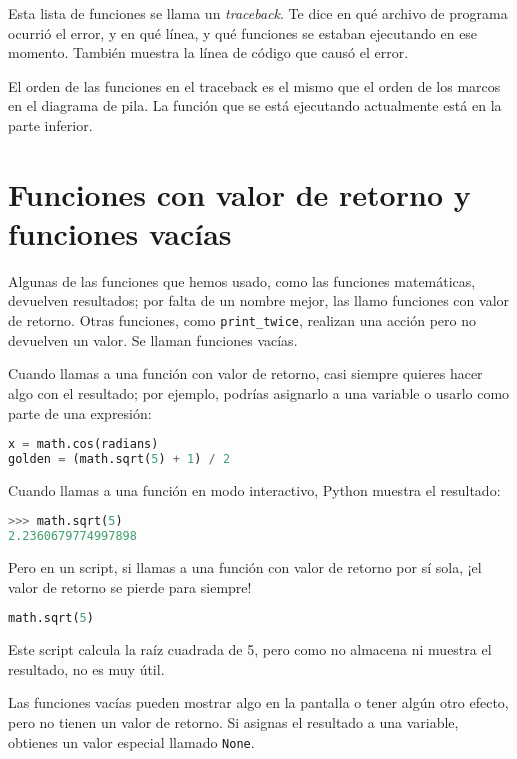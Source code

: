 \documentclass[12pt,letterpaper]{book}
\begin{document}
Esta lista de funciones se llama un \textit{traceback}. Te dice en qué archivo de programa ocurrió el error, y en qué línea, y qué funciones se estaban ejecutando en ese momento. También muestra la línea de código que causó el error.

El orden de las funciones en el traceback es el mismo que el orden de los marcos en el diagrama de pila. La función que se está ejecutando actualmente está en la parte inferior.

\section{Funciones con valor de retorno y funciones vacías}

Algunas de las funciones que hemos usado, como las funciones matemáticas, devuelven resultados; por falta de un nombre mejor, las llamo funciones con valor de retorno. Otras funciones, como \texttt{print\_twice}, realizan una acción pero no devuelven un valor. Se llaman funciones vacías.

Cuando llamas a una función con valor de retorno, casi siempre quieres hacer algo con el resultado; por ejemplo, podrías asignarlo a una variable o usarlo como parte de una expresión:

\begin{lstlisting}[language=Python]
x = math.cos(radians)
golden = (math.sqrt(5) + 1) / 2
\end{lstlisting}

Cuando llamas a una función en modo interactivo, Python muestra el resultado:

\begin{lstlisting}[language=Python]
>>> math.sqrt(5)
2.2360679774997898
\end{lstlisting}

Pero en un script, si llamas a una función con valor de retorno por sí sola, ¡el valor de retorno se pierde para siempre!

\begin{lstlisting}[language=Python]
math.sqrt(5)
\end{lstlisting}

Este script calcula la raíz cuadrada de 5, pero como no almacena ni muestra el resultado, no es muy útil.

Las funciones vacías pueden mostrar algo en la pantalla o tener algún otro efecto, pero no tienen un valor de retorno. Si asignas el resultado a una variable, obtienes un valor especial llamado \texttt{None}.
\end{document}
